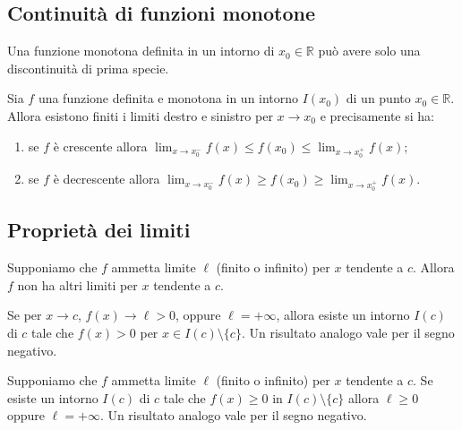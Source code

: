 \documentclass[11pt,a4paper]{article}
\begin{document}
\subsection{Continuità di funzioni monotone}

\begin{osservazione}
Una funzione monotona definita in un intorno di $x_0 \in \mathbb{R}$ può avere solo una discontinuità di prima specie.
\end{osservazione}

\begin{teorema}[Corollario]
Sia $f$ una funzione definita e monotona in un intorno $I(x_0)$ di un punto $x_0 \in \mathbb{R}$. Allora esistono finiti i limiti destro e sinistro per $x \to x_0$ e precisamente si ha:
\begin{enumerate}
    \item[(i)] se $f$ è crescente allora $\displaystyle\lim_{x\to x_0^-} f(x) \le f(x_0) \le \lim_{x\to x_0^+} f(x)$;
    \item[(ii)] se $f$ è decrescente allora $\displaystyle\lim_{x\to x_0^-} f(x) \ge f(x_0) \ge \lim_{x\to x_0^+} f(x)$.
\end{enumerate}
\end{teorema}

\subsection{Proprietà dei limiti}

\begin{teorema}
Supponiamo che $f$ ammetta limite $\ell$ (finito o infinito) per $x$ tendente a $c$. Allora $f$ non ha altri limiti per $x$ tendente a $c$.
\end{teorema}

\begin{teorema}
Se per $x \to c$, $f(x) \to \ell > 0$, oppure $\ell = +\infty$, allora esiste un intorno $I(c)$ di $c$ tale che $f(x) > 0$ per $x \in I(c) \setminus \{c\}$. Un risultato analogo vale per il segno negativo.
\end{teorema}

\begin{teorema}
Supponiamo che $f$ ammetta limite $\ell$ (finito o infinito) per $x$ tendente a $c$. Se esiste un intorno $I(c)$ di $c$ tale che $f(x) \ge 0$ in $I(c) \setminus \{c\}$ allora $\ell \ge 0$ oppure $\ell = +\infty$. Un risultato analogo vale per il segno negativo.
\end{teorema}
\end{document}

